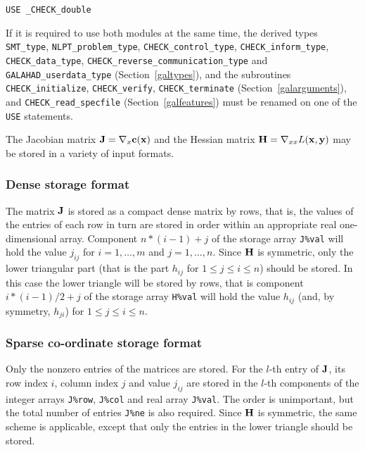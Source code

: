 \documentclass{galahad}
\newcommand{\packagename}{CHECK}
\newcommand{\fullpackagename}{\libraryname\_\packagename}
\begin{document}
\medskip{}

\hspace{8mm} {\tt USE  \fullpackagename\_double}

\medskip

\noindent
If it is required to use both modules at the same time, the derived types 
{\tt SMT\_type}, 
{\tt NLPT\_problem\_type}, 
{\tt \packagename\_\-control\_type}, 
{\tt \packagename\_inform\_type},
{\tt \packagename\_data\_type},
{\tt \packagename\_reverse\_communication\_type} and
{\tt GALAHAD\_userdata\_\-type}
(Section~\ref{galtypes}),
and the subroutines
{\tt \packagename\_initialize}, 
{\tt \packagename\_verify},
{\tt \packagename\_terminate}
(Section~\ref{galarguments}),
and 
{\tt \packagename\_read\_specfile}
(Section~\ref{galfeatures})
must be renamed on one of the {\tt USE} statements.


\galmatrix
The Jacobian matrix ${\mathbf{J}} = \nabla_x{\mathbf{c}}({\mathbf{x}})$ and the Hessian matrix ${\mathbf{H}} = \nabla_{xx} L({\mathbf{x}},{\mathbf{y}})$
may be stored in a variety of input formats.

\subsubsection{Dense storage format}\label{dense}
The matrix ${\mathbf{J}}$ is stored as a compact 
dense matrix by rows, that is, the values of the entries of each row in turn are
stored in order within an appropriate real one-dimensional array.
Component $n \ast (i-1) + j$ of the storage array {\tt J\%val} will hold the 
value $j_{ij}$ for $i = 1, \ldots , m$ and $j = 1, \ldots , n$.
Since ${\mathbf{H}}$ is symmetric, only the lower triangular part (that is the part 
$h_{ij}$ for $1 \leq j \leq i \leq n$) should be stored.  In this case
the lower triangle will be stored by rows, that is 
component $i \ast (i-1)/2 + j$ of the storage array {\tt H\%val}  
will hold the value $h_{ij}$ (and, by symmetry, $h_{ji}$)
for $1 \leq j \leq i \leq n$.

\subsubsection{Sparse co-ordinate storage format}\label{coordinate}
Only the nonzero entries of the matrices are stored. For the $l$-th
entry of ${\mathbf{J}}$, its row index $i$, column index $j$ and value
$j_{ij}$ are stored in the $l$-th components of the integer arrays
{\tt J\%row}, {\tt J\%col} and real array {\tt J\%val}.  The order is
unimportant, but the total number of entries {\tt J\%ne} is also
required.  Since ${\mathbf{H}}$ is symmetric, the same scheme is applicable,
except that only the entries in the lower triangle should be stored.
\end{document}
